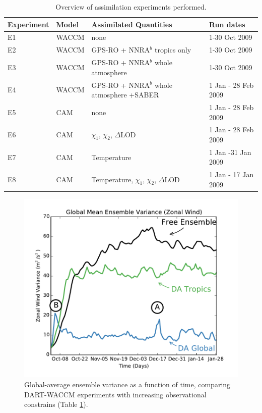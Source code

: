 \begin{table}
\caption{Overview of assimilation experiments performed.}
\centering
\begin{tabular}{p{2cm}p{2cm}p{6cm}p{4cm}}
	Experiment& Model &  Assimilated Quantities  & Run dates \\
\hline
E1 & WACCM &	none   & 1-30 Oct 2009	\\
E2 & WACCM &	GPS-RO + NNRA$^b$ tropics only & 1-30 Oct 2009	\\
E3 & WACCM &	GPS-RO + NNRA$^b$ whole atmosphere  & 1-30 Oct 2009	\\
E4 & WACCM &	GPS-RO + NNRA$^b$ whole atmosphere +SABER & 1 Jan - 28 Feb 2009\\	
E5 & CAM	&	none &  1 Jan - 28 Feb 2009 \\
E6 & CAM &	$\chi_1$, $\chi_2$, $\Delta$LOD	& 1 Jan - 28 Feb 2009 \\
E7 & CAM &	Temperature	& 1 Jan -31 Jan 2009	\\
E8 & CAM &	Temperature, $\chi_1$, $\chi_2$, $\Delta$LOD	& 1 Jan - 17 Jan 2009\\
\hline
\end{tabular}
\label{tab:expts}
\end{table}
\clearpage

 \begin{figure}
	 \includegraphics[width=\textwidth]{Paper_figures/ERPDA_paper_evalvariable_state_space.pdf}
	 \caption{Global-average ensemble variance as a function of time, comparing DART-WACCM experiments with increasing observational constrains (Table \ref{tab:expts}).}
	 \label{fig:evalvariable_state}
\end{figure}

